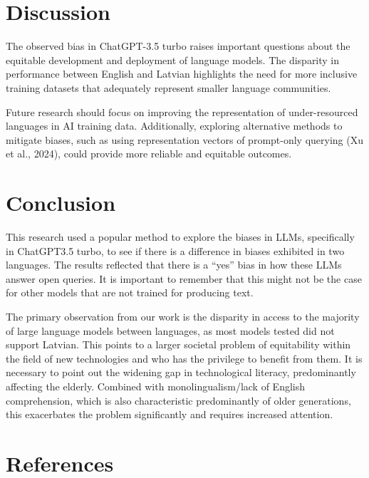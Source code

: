 \documentclass[11pt,twocolumn]{article}
\begin{document}
\section{Discussion}

The observed bias in ChatGPT-3.5 turbo raises important questions about the equitable development and deployment of language models. The disparity in performance between English and Latvian highlights the need for more inclusive training datasets that adequately represent smaller language communities.

Future research should focus on improving the representation of under-resourced languages in AI training data. Additionally, exploring alternative methods to mitigate biases, such as using representation vectors of prompt-only querying (Xu et al., 2024), could provide more reliable and equitable outcomes.

\section{Conclusion}

This research used a popular method to explore the biases in LLMs, specifically in ChatGPT3.5 turbo, to see if there is a difference in biases exhibited in two languages. The results reflected that there is a “yes” bias in how these LLMs answer open queries. It is important to remember that this might not be the case for other models that are not trained for producing text.

The primary observation from our work is the disparity in access to the majority of large language models between languages, as most models tested did not support Latvian. This points to a larger societal problem of equitability within the field of new technologies and who has the privilege to benefit from them. It is necessary to point out the widening gap in technological literacy, predominantly affecting the elderly. Combined with monolingualism/lack of English comprehension, which is also characteristic predominantly of older generations, this exacerbates the problem significantly and requires increased attention.

\section{References}
\end{document}
